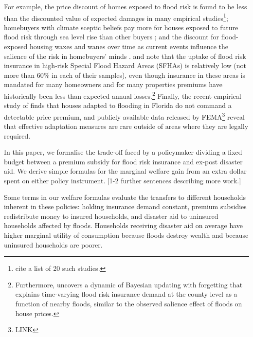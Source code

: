 \documentclass[12pt]{article}
\begin{document}
For example, the price discount of homes exposed to flood risk is found to be less than the discounted value of expected damages in many empirical studies\footnote{\cite{fairweather2024expecting} cite a list of 20 such studies.}; homebuyers with climate sceptic beliefs pay more for houses exposed to future flood risk through sea level rise than other buyers \citep{bernstein2019disaster,baldauf2020does,bakkensen2025leveraging}; and the discount for flood-exposed housing waxes and wanes over time as current events influence the salience of the risk in   homebuyers' minds \citep{keys2020neglected,giglio2021rfs}. \cite{wagner2022adaptation} and \cite{amornsiripanitch2025measuring} note that the uptake of flood risk insurance in high-risk Special Flood Hazard Areas (SFHAs) is relatively low (not more than 60$\%$ in each of their samples), even though insurance in these areas is mandated for many homeowners and for many properties premiums have historically been less than expected annual losses.\footnote{Furthermore, \cite{gallagher2014learning} uncovers a dynamic of Bayesian updating with forgetting that explains time-varying flood risk insurance demand at the county level as a function of nearby floods, similar to the observed salience effect of floods on house prices.} Finally, the recent empirical study of \cite{ostriker2022effects} finds that houses adapted to flooding in Florida do not command a detectable price premium, and publicly available data released by FEMA\footnote{LINK} reveal that effective adaptation measures are rare outside of areas where they are legally required.




In this paper, we formalise the trade-off faced by a policymaker dividing a fixed budget between a premium subsidy for flood risk insurance and ex-post disaster aid. We derive simple formulas for the marginal welfare gain from an extra dollar spent on either policy instrument. [1-2 further sentences describing more work.]

Some terms in our welfare formulas evaluate the transfers to different households inherent in these policies: holding insurance demand constant,  premium subsidies redistribute money to insured households, and disaster aid to uninsured households affected by floods. Households receiving disaster aid on average have higher marginal utility of consumption because floods destroy wealth and because uninsured households are poorer.
\end{document}
